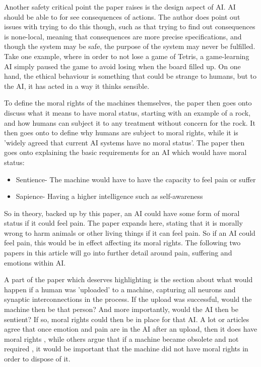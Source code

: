 \documentclass[article]{IEEEtran}
\begin{document}
Another safety critical point the paper raises is the design aspect of AI. AI should be able to for see consequences of actions. The author does point out issues with trying to do this though, such as that trying to find out consequences is none-local, meaning that consequences are more precise specifications, and though the system may be safe, the purpose of the system may never be fulfilled. Take one example, where in order to not lose a game of Tetris, a game-learning AI\cite{tetris} simply paused the game to avoid losing when the board filled up. On one hand, the ethical behaviour is something that could be strange to humans, but to the AI, it has acted in a way it thinks sensible.\par
To define the moral rights of the machines themselves, the paper then goes onto discuss what it means to have moral status, starting with an example of a rock, and how humans can subject it to any treatment without concern for the rock. It then goes onto to define why humans are subject to moral rights, while it is 'widely agreed that current AI systems have no moral status'. The paper then goes onto explaining the basic requirements for an AI which would have moral status:
\begin{itemize}
\item Sentience- The machine would have to have the capacity to feel pain or suffer
\item Sapience- Having a higher intelligence such as self-awareness
\end{itemize}
So in theory, backed up by this paper, an AI could have some form of moral status if it could feel pain. The paper expands here, stating that it is morally wrong to harm animals or other living things if it can feel pain. So if an AI could feel pain, this would be in effect affecting its moral rights. The following two papers in this article will go into further detail around pain, suffering and emotions within AI.\par
A part of the paper which deserves highlighting is the section about what would happen if a human was 'uploaded' to a machine, capturing all neurons and synaptic interconnections in the process. If the upload was successful, would the machine then be that person? And more importantly, would the AI then be sentient? If so, moral rights could then be in place for that AI. A lot or articles agree that once emotion and pain are in the AI after an upload, then it does have moral rights \cite{rightsTrue}, while others argue that if a machine became obsolete and not required \cite{rightsFalse}, it would be important that the machine did not have moral rights in order to dispose of it. \par
\end{document}
